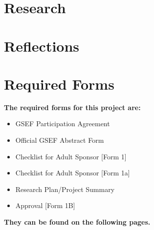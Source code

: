 \documentclass{article}
\newcounter{reflection}
\newcounter{research}
\begin{document}
%

\part{Research}

\newpage

\part{Reflections}


\newpage

\part{Required Forms}

\textbf{The required forms for this project are:}

\begin{itemize}
  \item GSEF Participation Agreement
  \item Official GSEF Abstract Form
  \item Checklist for Adult Sponsor [Form 1]
  \item Checklist for Adult Sponsor [Form 1a]
  \item Research Plan/Project Summary
  \item Approval [Form 1B]
\end{itemize}

\textbf{They can be found on the following pages.}
\end{document}
